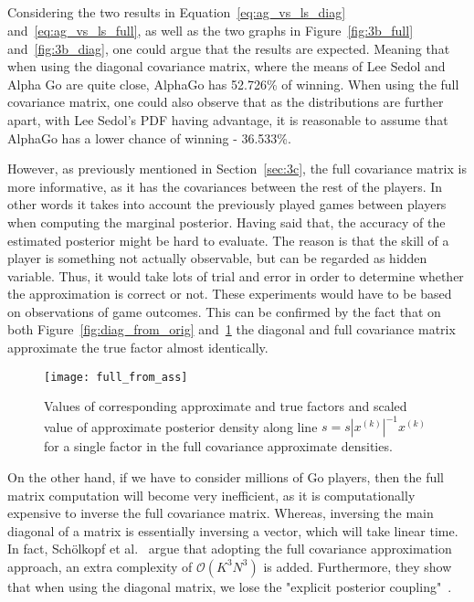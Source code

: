 \documentclass[a4paper,11pt]{article}
\theoremstyle{mytheor}
\begin{document}
\subsection{}
Considering the two results in Equation~\ref{eq:ag_vs_ls_diag} and~\ref{eq:ag_vs_ls_full}, as well as the two graphs in Figure~\ref{fig:3b_full} and~\ref{fig:3b_diag}, one could argue that the results are expected. Meaning that when using the diagonal covariance matrix, where the means of Lee Sedol and Alpha Go are quite close, AlphaGo has 52.726\% of winning. When using the full covariance matrix, one could also observe that as the distributions are further apart, with Lee Sedol's PDF having advantage, it is reasonable to assume that AlphaGo has a lower chance of winning - 36.533\%.

However, as previously mentioned in Section~\ref{sec:3c}, the full covariance matrix is more informative, as it has the covariances between the rest of the players. In other words it takes into account the previously played games between players when computing the marginal posterior. Having said that, the accuracy of the estimated posterior might be hard to evaluate. The reason is that the skill of a player is something not actually observable, but can be regarded as hidden variable. Thus, it would take lots of trial and error in order to determine whether the approximation is correct or not. These experiments would have to be based on observations of game outcomes.
This can be confirmed by the fact that on both Figure~\ref{fig:diag_from_orig} and~\ref{fig:full_from_orig} the diagonal and full covariance matrix approximate the true factor almost identically.

\begin{figure}[htpb!]
    \centering
    \texttt{[image: full\_from\_ass]}
    \caption{Values of corresponding approximate and true factors and scaled value of approximate posterior density along line $s=s|x^{(k)}|^{-1}x^{(k)}$ for a single factor in the full covariance approximate densities.}
    \label{fig:full_from_orig}
\end{figure}

On the other hand, if we have to consider millions of Go players, then the full matrix computation will become very inefficient, as it is computationally expensive to inverse the full covariance matrix. Whereas, inversing the main diagonal of a matrix is essentially inversing a vector, which will take linear time. In fact, Sch{\"o}lkopf et al.~\cite{scholkopf2007advances} argue that adopting the full covariance approximation approach, an extra complexity of $\mathcal{O}(K^3N^3)$ is added. Furthermore, they show that when using the diagonal matrix, we lose the "explicit posterior coupling"~\cite{scholkopf2007advances}.
\end{document}

